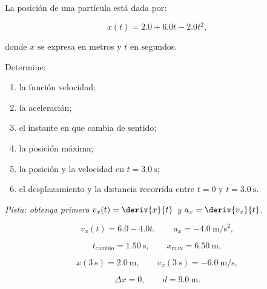 \begin{ejercicio}
La posición de una partícula está dada por:

\[ x(t)=2.0+6.0t-2.0t^2, \]

donde \(x\) se expresa en metros y \(t\) en segundos.

Determine:

\begin{enumerate}[label=\alph*)]
    \item la función velocidad;
    \item la aceleración;
    \item el instante en que cambia de sentido;
    \item la posición máxima;
    \item la posición y la velocidad en \(t=\SI{3.0}{\second}\);
    \item el desplazamiento y la distancia recorrida entre \(t=0\) y \(t=\SI{3.0}{\second}\).
\end{enumerate}

\textit{Pista: obtenga primero \(v_x(t)=\deriv{x}{t}\) y \(a_x=\deriv{v_x}{t}\).}
\end{ejercicio}

\begin{respuesta}
\[
v_x(t)=6.0-4.0t,
\qquad
a_x=-\SI{4.0}{\meter\per\second\squared},
\]

\[
t_{\mathrm{cambio}}=\SI{1.50}{\second},
\qquad
x_{\max}=\SI{6.50}{\meter},
\]

\[
x(\SI{3}{\second})=\SI{2.0}{\meter},
\qquad
v_x(\SI{3}{\second})=-\SI{6.0}{\meter\per\second},
\]

\[
\Delta x=0,
\qquad
d=\SI{9.0}{\meter}.
\]
\end{respuesta}

